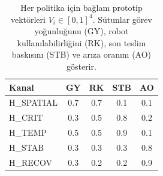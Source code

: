 \begin{table}[t]
\centering
\caption{Her politika için bağlam prototip vektörleri $V_i \in [0,1]^4$.
Sütunlar görev yoğunluğunu (GY), robot kullanılabilirliğini (RK), son teslim
baskısını (STB) ve arıza oranını (AO) gösterir.}
\label{tab:hormones-proto}
\small
\setlength{\tabcolsep}{4pt}
\begin{tabular}{@{}lcccc@{}}
\toprule
\textbf{Kanal} & GY & RK & STB & AO \\
\midrule
H\_SPATIAL & 0.7 & 0.7 & 0.1 & 0.1 \\
H\_CRIT    & 0.3 & 0.5 & 0.8 & 0.2 \\
H\_TEMP    & 0.5 & 0.5 & 0.9 & 0.1 \\
H\_STAB    & 0.3 & 0.3 & 0.3 & 0.8 \\
H\_RECOV   & 0.3 & 0.2 & 0.2 & 0.9 \\
\bottomrule
\end{tabular}
\end{table}
